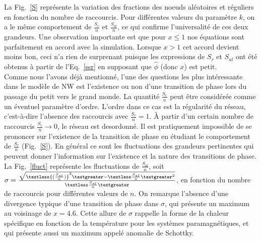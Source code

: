 La Fig.~\ref{S} représente la variation des fractions des noeuds aléatoires et réguliers en fonction du nombre de raccourcis. Pour différentes valeurs du paramètre $k$, on a le même comportement de  $\frac{S_{r}}{n}$ et $\frac{S_{al}}{n}$, ce qui confirme l'universalité de ces deux grandeurs. Une observation importante est que pour $x\le1$ nos équations sont parfaitement en accord avec la simulation. Lorsque $x>1$ cet accord devient moins bon, ceci n'a rien de surprenant puisque les expressions de $S_{r}$ et $S_{al}$ ont été obtenus à partir de l'Eq.~\ref{ssr} en supposant que $\hat{\phi}$ (donc $x$) est petit.\\
Comme nous l'avons déjà mentionné, l'une des questions les plus intéressante dans le modèle de NW est l'existence ou non d'une transition de phase lors du passage du petit vers le grand monde. La quantité $\frac{S_{r}}{n}$ peut être considérée comme un éventuel paramètre d'ordre. L'ordre dans ce cas est la régularité du réseau, c'est-à-dire l'absence des raccourcis avec $\frac{S_{r}}{n}=1$. \`{A} partir d'un certain nombre de raccourcis $\frac{S_{r}}{n} \longrightarrow 0$, le réseau est desordonné. Il est pratiquement impossible de se prononcer sur l'existence de la transition de phase en étudiant le comportement de  $\frac{S_{r}}{n}$ (Fig.~\ref{S}). En général ce sont les fluctuations des grandeurs pertinentes qui peuvent donner l'information sur l'existence et la nature des transitions de phase. La Fig.~\ref{fluct} représente les fluctuations de $\frac{S_{al}}{n}$, soit  $\sigma=\frac{\sqrt{\textless{( \frac{S_{al}}{n})}^2\textgreater-\textless \frac{S_{al}}{n}\textgreater^2}}{\textless \frac{S_{al}}{n}\textgreater}$, en fonction du nombre de raccourcis  pour différentes valeurs de $n$. On remarque l'absence d'une divergence typique d'une transition de phase dans $\sigma$, qui présente un maximum au voisinage de $x=4.6$. Cette allure de $\sigma$ rappelle la forme de la chaleur spécifique en fonction de la température pour les systèmes paramagnétiques, et qui présente aussi un maximum appelé anomalie de Schottky.  

